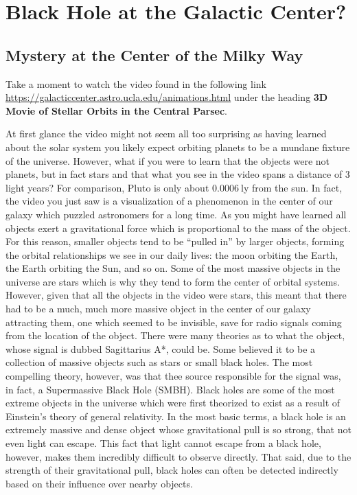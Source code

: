 \chapter{Black Hole at the Galactic Center?}

\section{Mystery at the Center of the Milky Way}
\begin{steps}
	\item Take a moment to watch the video found in the following link \url{https://galacticcenter.astro.ucla.edu/animations.html} under the heading \textbf{3D Movie of Stellar Orbits in the Central Parsec}.
\end{steps}
At first glance the video might not seem all too surprising as having learned about the solar system you likely expect orbiting planets to be a mundane fixture of the universe. However, what if you were to learn that the objects were not planets, but in fact stars and that what you see in the video spans a distance of 3 light years? For comparison, Pluto is only about $0.0006\:$ly from the sun. In fact, the video you just saw is a visualization of a phenomenon in the center of our galaxy which puzzled astronomers for a long time. As you might have learned all objects exert a gravitational force which is proportional to the mass of the object. For this reason, smaller objects tend to be ``pulled in'' by larger objects, forming the orbital relationships we see in our daily lives: the moon orbiting the Earth, the Earth orbiting the Sun, and so on. Some of the most massive objects in the universe are stars which is why they tend to form the center of orbital systems. However, given that all the objects in the video were stars, this meant that there had to be a much, much more massive object in the center of our galaxy attracting them, one which seemed to be invisible, save for radio signals coming from the location of the object. There were many theories as to what the object, whose signal is dubbed Sagittarius A*, could  be. Some believed it to be a collection of massive objects such as stars or small black holes. The most compelling theory, however, was that thee source responsible for the signal was, in fact, a Supermassive Black Hole (SMBH).
Black holes are some of the most extreme objects in the universe which were first theorized to exist as a result of Einstein's theory of general relativity. In the most basic terms, a black hole is an extremely massive and dense object whose gravitational pull is so strong, that not even light can escape. This fact that light cannot escape from a black hole,  however, makes them incredibly difficult to observe directly. That said, due to the strength of their gravitational pull, black holes can often be detected indirectly based on their influence over nearby objects.

